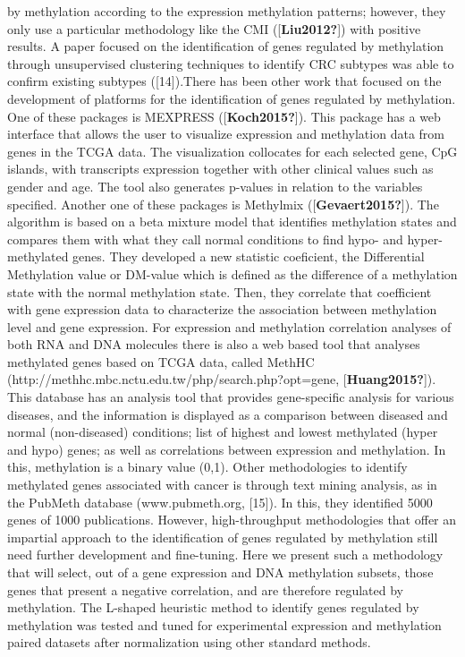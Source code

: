 \documentclass[10pt,letterpaper]{article}
\begin{document}
by methylation according to the expression methylation patterns;
however, they only use a particular methodology like the CMI
({[}\textbf{Liu2012?}{]}) with positive results. A paper focused on the
identification of genes regulated by methylation through unsupervised
clustering techniques to identify CRC subtypes was able to confirm
existing subtypes ({[}14{]}).There has been other work that focused on
the development of platforms for the identification of genes regulated
by methylation. One of these packages is MEXPRESS
({[}\textbf{Koch2015?}{]}). This package has a web interface that allows
the user to visualize expression and methylation data from genes in the
TCGA data. The visualization collocates for each selected gene, CpG
islands, with transcripts expression together with other clinical values
such as gender and age. The tool also generates p-values in relation to
the variables specified. Another one of these packages is Methylmix
({[}\textbf{Gevaert2015?}{]}). The algorithm is based on a beta mixture
model that identifies methylation states and compares them with what
they call normal conditions to find hypo- and hyper-methylated genes.
They developed a new statistic coeficient, the Differential Methylation
value or DM-value which is defined as the difference of a methylation
state with the normal methylation state. Then, they correlate that
coefficient with gene expression data to characterize the association
between methylation level and gene expression. For expression and
methylation correlation analyses of both RNA and DNA molecules there is
also a web based tool that analyses methylated genes based on TCGA data,
called MethHC (http://methhc.mbc.nctu.edu.tw/php/search.php?opt=gene,
{[}\textbf{Huang2015?}{]}). This database has an analysis tool that
provides gene-specific analysis for various diseases, and the
information is displayed as a comparison between diseased and normal
(non-diseased) conditions; list of highest and lowest methylated (hyper
and hypo) genes; as well as correlations between expression and
methylation. In this, methylation is a binary value (0,1). Other
methodologies to identify methylated genes associated with cancer is
through text mining analysis, as in the PubMeth database
(www.pubmeth.org, {[}15{]}). In this, they identified 5000 genes of 1000
publications. However, high-throughput methodologies that offer an
impartial approach to the identification of genes regulated by
methylation still need further development and fine-tuning. Here we
present such a methodology that will select, out of a gene expression
and DNA methylation subsets, those genes that present a negative
correlation, and are therefore regulated by methylation. The L-shaped
heuristic method to identify genes regulated by methylation was tested
and tuned for experimental expression and methylation paired datasets
after normalization using other standard methods.
\end{document}
